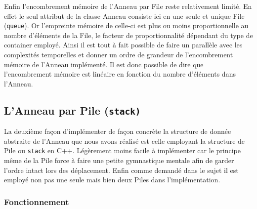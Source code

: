 \documentclass{article}
\newcommand{\info}{\texttt}
\begin{document}
        Enfin l'encombrement mémoire de l'Anneau par File reste relativement limité. En effet le seul attribut de la classe Anneau consiste ici en une seule et unique File (\info{queue}). Or l'empreinte mémoire de celle-ci est plus ou moins proportionnelle au nombre d'éléments de la File, le facteur de proportionnalité dépendant du type de container employé. Ainsi il est tout à fait possible de faire un parallèle avec les complexités temporelles et donner un ordre de grandeur de l'encombrement mémoire de l'Anneau implémenté. Il est donc possible de dire que l'encombrement mémoire est linéaire en fonction du nombre d'éléments dans l'Anneau.
    
    \subsection{L'Anneau par Pile (\info{stack)}}
    
    La deuxième façon d'implémenter de façon concrète la structure de donnée abstraite de l'Anneau que nous avons réalisé est celle employant la structure de Pile ou \info{stack} en C++. Légèrement moins facile à implémenter car le principe même de la Pile force à faire une petite gymnastique mentale afin de garder l'ordre intact lors des déplacement. Enfin comme demandé dans le sujet il est employé non pas une seule mais bien deux Piles dans l'implémentation.
    
        \subsubsection{Fonctionnement}
        
\end{document}
